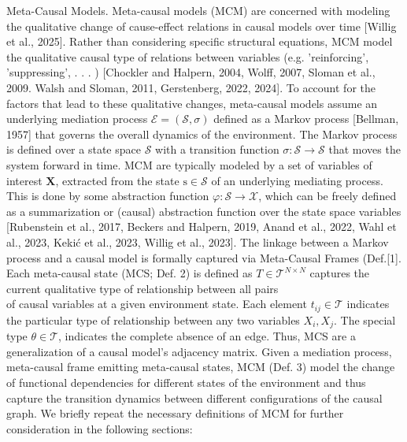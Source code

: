 \documentclass[10pt]{article}
\begin{document}
Meta-Causal Models. Meta-causal models (MCM) are concerned with modeling the qualitative change of cause-effect relations in causal models over time [Willig et al., 2025]. Rather than considering specific structural equations, MCM model the qualitative causal type of relations between variables (e.g. 'reinforcing', 'suppressing', . . . ) [Chockler and Halpern, 2004, Wolff, 2007, Sloman et al., 2009. Walsh and Sloman, 2011, Gerstenberg, 2022, 2024]. To account for the factors that lead to these qualitative changes, meta-causal models assume an underlying mediation process $\mathcal{E}=(\mathcal{S}, \sigma)$ defined as a Markov process [Bellman, 1957] that governs the overall dynamics of the environment. The Markov process is defined over a state space $\mathcal{S}$ with a transition function $\sigma: \mathcal{S} \rightarrow \mathcal{S}$ that moves the system forward in time. MCM are typically modeled by a set of variables of interest $\mathbf{X}$, extracted from the state $\mathrm{s} \in \mathcal{S}$ of an underlying mediating process. This is done by some abstraction function $\varphi: \mathcal{S} \rightarrow \mathcal{X}$, which can be freely defined as a summarization or (causal) abstraction function over the state space variables [Rubenstein et al., 2017, Beckers and Halpern, 2019, Anand et al., 2022, Wahl et al., 2023, Kekić et al., 2023, Willig et al., 2023]. The linkage between a Markov process and a causal model is formally captured via Meta-Causal Frames (Def.[1]. Each meta-causal state (MCS; Def. 2) is defined as $T \in \mathcal{T}^{N \times N}$ captures the current qualitative type of relationship between all pairs\\
of causal variables at a given environment state. Each element $t_{i j} \in \mathcal{T}$ indicates the particular type of relationship between any two variables $X_{i}, X_{j}$. The special type $\theta \in \mathcal{T}$, indicates the complete absence of an edge. Thus, MCS are a generalization of a causal model's adjacency matrix. Given a mediation process, meta-causal frame emitting meta-causal states, MCM (Def. 3) model the change of functional dependencies for different states of the environment and thus capture the transition dynamics between different configurations of the causal graph. We briefly repeat the necessary definitions of MCM for further consideration in the following sections:\\
\end{document}
